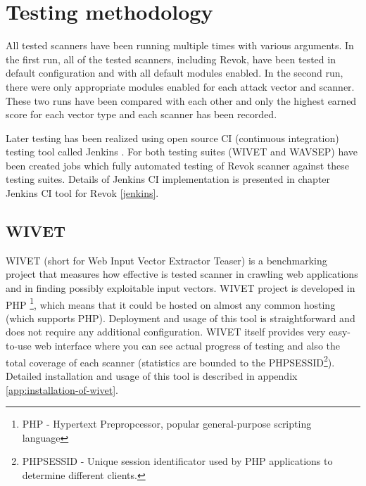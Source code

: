 	\section{Testing methodology}\label{testing-methodology}
	
	All tested scanners have been running multiple times with various arguments. In the first run, all of the tested scanners, including Revok, have been tested in default configuration and with all default modules enabled. In the second run, there were only appropriate modules enabled for each attack vector and scanner. These two runs have been compared with each other and only the highest earned score for each vector type and each scanner has been recorded. 
	
	Later testing has been realized using open source CI (continuous integration) testing tool called Jenkins \cite{jenkins}. For both testing suites (WIVET and WAVSEP) have been created jobs which fully automated testing of Revok scanner against these testing suites. Details of Jenkins CI implementation is presented in chapter Jenkins CI tool for Revok \ref{jenkins}.
		

		\subsection{WIVET}\label{wivet}
		
		WIVET \cite{WIVET} (short for Web Input Vector Extractor Teaser) is a benchmarking project that measures how effective is tested scanner in crawling web applications and in finding possibly exploitable input vectors. WIVET project is developed in PHP \footnote{PHP - Hypertext Prepropcessor, popular general-purpose scripting language}, which means that it could be hosted on almost any common hosting (which supports PHP). Deployment and usage of this tool is straightforward and does not require any additional configuration. WIVET itself provides very easy-to-use web interface where you can see actual progress of testing and also the total coverage of each scanner (statistics are bounded to the PHPSESSID\footnote{PHPSESSID - Unique session identificator used by PHP applications to determine different clients.}). Detailed installation and usage of this tool is described in appendix \ref{app:installation-of-wivet}.

